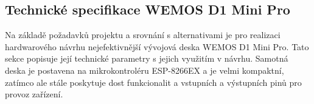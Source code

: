 \subsection{Technické specifikace WEMOS D1 Mini Pro}

Na základě požadavků projektu a srovnání s alternativami je pro realizaci hardwarového návrhu nejefektivnější vývojová deska WEMOS D1 Mini Pro. Tato sekce popisuje její technické parametry s jejich využitím v návrhu. Samotná deska je postavena na mikrokontroléru ESP-8266EX a je velmi kompaktní, zatímco ale stále poskytuje dost funkcionalit a vstupních a výstupních pinů pro provoz zařízení.

